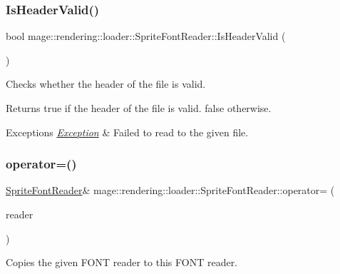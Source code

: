 \subsubsection{\texorpdfstring{Is\+Header\+Valid()}{IsHeaderValid()}}
{\footnotesize\ttfamily bool mage\+::rendering\+::loader\+::\+Sprite\+Font\+Reader\+::\+Is\+Header\+Valid (\begin{DoxyParamCaption}{ }\end{DoxyParamCaption})\hspace{0.3cm}{\ttfamily [private]}}

Checks whether the header of the file is valid.

\begin{DoxyReturn}{Returns}
{\ttfamily true} if the header of the file is valid. {\ttfamily false} otherwise. 
\end{DoxyReturn}

\begin{DoxyExceptions}{Exceptions}
{\em \hyperlink{classmage_1_1_exception}{Exception}} & Failed to read to the given file. \\
\hline
\end{DoxyExceptions}
\hypertarget{classmage_1_1rendering_1_1loader_1_1_sprite_font_reader_a645988b6bba2a4fda93d18c4c9e3d09c}{}\label{classmage_1_1rendering_1_1loader_1_1_sprite_font_reader_a645988b6bba2a4fda93d18c4c9e3d09c} 
\subsubsection{\texorpdfstring{operator=()}{operator=()}\hspace{0.1cm}{\footnotesize\ttfamily [1/2]}}
{\footnotesize\ttfamily \hyperlink{classmage_1_1rendering_1_1loader_1_1_sprite_font_reader}{Sprite\+Font\+Reader}\& mage\+::rendering\+::loader\+::\+Sprite\+Font\+Reader\+::operator= (\begin{DoxyParamCaption}\item[{const \hyperlink{classmage_1_1rendering_1_1loader_1_1_sprite_font_reader}{Sprite\+Font\+Reader} \&}]{reader }\end{DoxyParamCaption})\hspace{0.3cm}{\ttfamily [delete]}}

Copies the given F\+O\+NT reader to this F\+O\+NT reader.


